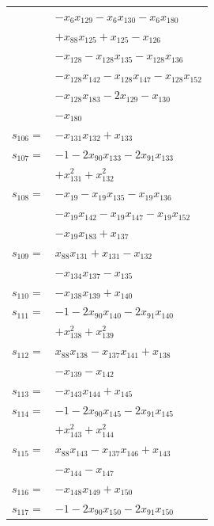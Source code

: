 \begin{longtable}{@{}r@{\;}l@{}}
 & \(\displaystyle -x_{6}x_{129} -x_{6}x_{130} -x_{6}x_{180}\) \\
 & \(\displaystyle +x_{88}x_{125} +x_{125} -x_{126}\) \\
 & \(\displaystyle -x_{128} -x_{128}x_{135} -x_{128}x_{136}\) \\
 & \(\displaystyle -x_{128}x_{142} -x_{128}x_{147} -x_{128}x_{152}\) \\
 & \(\displaystyle -x_{128}x_{183} -2x_{129} -x_{130}\) \\
 & \(\displaystyle -x_{180}\) \\[3pt]
\(s_{106}=\) & \(\displaystyle -x_{131}x_{132} +x_{133}\) \\[3pt]
\(s_{107}=\) & \(\displaystyle -1 -2x_{90}x_{133} -2x_{91}x_{133}\) \\
 & \(\displaystyle +x_{131}^{2} +x_{132}^{2}\) \\[3pt]
\(s_{108}=\) & \(\displaystyle -x_{19} -x_{19}x_{135} -x_{19}x_{136}\) \\
 & \(\displaystyle -x_{19}x_{142} -x_{19}x_{147} -x_{19}x_{152}\) \\
 & \(\displaystyle -x_{19}x_{183} +x_{137}\) \\[3pt]
\(s_{109}=\) & \(\displaystyle x_{88}x_{131} +x_{131} -x_{132}\) \\
 & \(\displaystyle -x_{134}x_{137} -x_{135}\) \\[3pt]
\(s_{110}=\) & \(\displaystyle -x_{138}x_{139} +x_{140}\) \\[3pt]
\(s_{111}=\) & \(\displaystyle -1 -2x_{90}x_{140} -2x_{91}x_{140}\) \\
 & \(\displaystyle +x_{138}^{2} +x_{139}^{2}\) \\[3pt]
\(s_{112}=\) & \(\displaystyle x_{88}x_{138} -x_{137}x_{141} +x_{138}\) \\
 & \(\displaystyle -x_{139} -x_{142}\) \\[3pt]
\(s_{113}=\) & \(\displaystyle -x_{143}x_{144} +x_{145}\) \\[3pt]
\(s_{114}=\) & \(\displaystyle -1 -2x_{90}x_{145} -2x_{91}x_{145}\) \\
 & \(\displaystyle +x_{143}^{2} +x_{144}^{2}\) \\[3pt]
\(s_{115}=\) & \(\displaystyle x_{88}x_{143} -x_{137}x_{146} +x_{143}\) \\
 & \(\displaystyle -x_{144} -x_{147}\) \\[3pt]
\(s_{116}=\) & \(\displaystyle -x_{148}x_{149} +x_{150}\) \\[3pt]
\(s_{117}=\) & \(\displaystyle -1 -2x_{90}x_{150} -2x_{91}x_{150}\) \\

\end{longtable}
